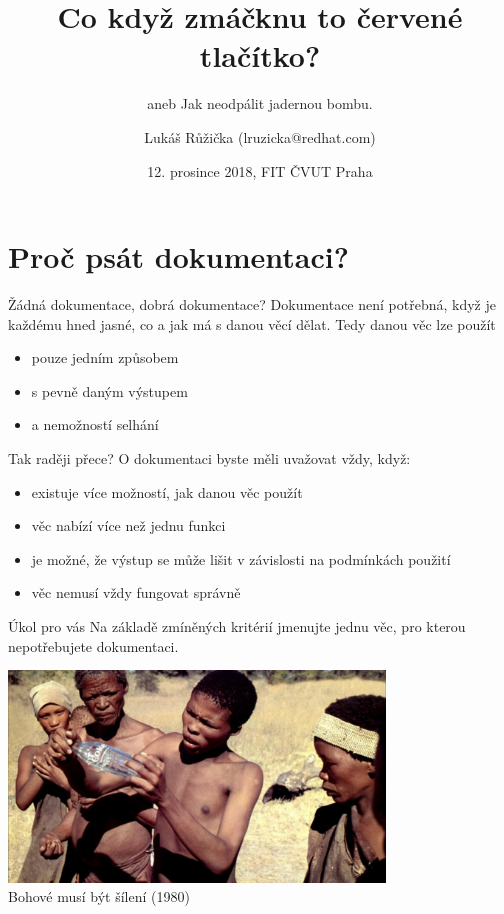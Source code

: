 \documentclass[12pt,a4paper]{beamer}
\title{Co když zmáčknu to červené tlačítko?}
\subtitle{aneb Jak neodpálit jadernou bombu.}
\author{Lukáš Růžička (lruzicka@redhat.com)}
\date{12. prosince 2018, FIT ČVUT Praha}
\begin{document}
	\maketitle
	
    \section{Proč psát dokumentaci?}
    
    	\begin{frame}{Žádná dokumentace, dobrá dokumentace?}
    	  Dokumentace není potřebná, když je každému hned jasné, co a jak má s danou věcí dělat. Tedy danou věc lze použít
    	  
    	  \begin{itemize}
    	  	\item pouze jedním způsobem
    	  	\item s pevně daným výstupem
    	  	\item a nemožností selhání
    	  \end{itemize}
		\end{frame}
	
		\begin{frame}{Tak raději přece?}
		   O dokumentaci byste měli uvažovat vždy, když:
		   \begin{itemize}
		   	\item existuje více možností, jak danou věc použít
		   	\item věc nabízí více než jednu funkci
		   	\item je možné, že výstup se může lišit v závislosti na podmínkách použití
		   	\item věc nemusí vždy fungovat správně
		   \end{itemize}
		\end{frame}
	
		\begin{frame}{Úkol pro vás}
		Na základě zmíněných kritérií jmenujte jednu věc, pro kterou nepotřebujete dokumentaci.
		\end{frame}
	
		\begin{frame}
			\begin{center}
				\includegraphics[width=10cm]{lahev_bohove.jpg}	\\
				Bohové musí být šílení (1980)
			\end{center}
		
		\end{frame}
	
\end{document}
